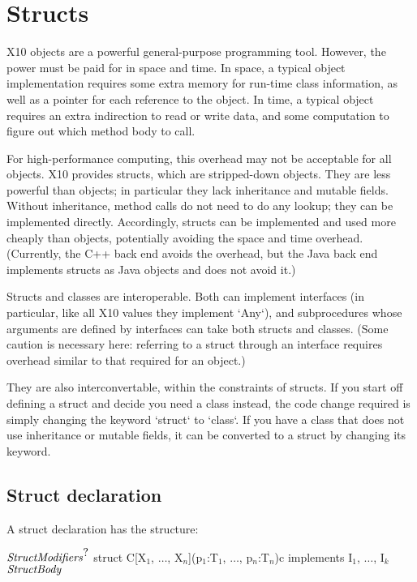 \chapter{Structs}
\label{XtenStructs}
\label{StructClasses}
\label{Structs}

X10 objects are a powerful general-purpose programming tool. However, the
power must be paid for in space and time. In space, a typical object
implementation requires some extra memory for run-time class information, as
well as a pointer for each reference to the object.  In time, a typical object
requires an extra indirection to read or write data, and some computation to
figure out which method body to call.  

For high-performance computing, this overhead may not be acceptable for all
objects. X10 provides structs, which are stripped-down objects. They are less
powerful than objects; in particular they lack inheritance and mutable fields.
Without inheritance, method calls do not need to do any lookup; they can be
implemented directly. Accordingly, structs can be implemented and used more
cheaply than objects, potentially avoiding the space and time overhead.
(Currently, the C++ back end avoids the overhead, but the Java back end
implements structs as Java objects and does not avoid it.)

Structs and classes are interoperable. Both can implement interfaces (in
particular, like all X10 values they implement \xcd`Any`), and subprocedures
whose arguments are defined by interfaces can take both structs and classes.
(Some caution is necessary here: referring to a struct through an interface
requires overhead similar to that required for an object.)

They are also interconvertable, within the constraints of structs. If you
start off defining a struct and decide you need a class instead, the code
change required is simply changing the keyword \xcd`struct` to \xcd`class`. If
you have a class that does not use inheritance or mutable fields, it can be
converted to a struct by changing its keyword.



\section{Struct declaration}
A struct declaration has the structure: 
\begin{xtenmath}
$\mbox{\emph{StructModifiers}}^{\mbox{?}}$
struct C[X$_1$, $\ldots$, X$_n$](p$_1$:T$_1$, $\ldots$, p$_n$:T$_n$){c} 
   implements I$_1$, $\ldots$, I$_k$ {
$\mbox{\emph{StructBody}}$
}
\end{xtenmath}


